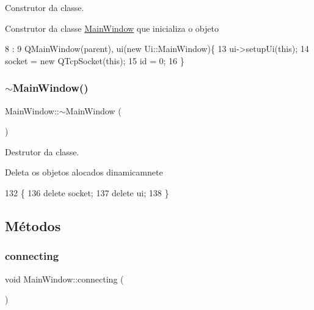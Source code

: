 Construtor da classe. 

Construtor da classe \hyperlink{class_main_window}{Main\+Window} que inicializa o objeto
\begin{DoxyCode}
8                                       :
9   QMainWindow(parent), ui(\textcolor{keyword}{new} Ui::MainWindow)\{
13   ui->setupUi(\textcolor{keyword}{this});
14   socket = \textcolor{keyword}{new} QTcpSocket(\textcolor{keyword}{this});
15   \textcolor{keywordtype}{id} = 0;
16 \}
\end{DoxyCode}
\mbox{\label{class_main_window_ae98d00a93bc118200eeef9f9bba1dba7}} 
\subsubsection{\texorpdfstring{$\sim$\+Main\+Window()}{~MainWindow()}}
{\footnotesize\ttfamily Main\+Window\+::$\sim$\+Main\+Window (\begin{DoxyParamCaption}{ }\end{DoxyParamCaption})}



Destrutor da classe. 

Deleta os objetos alocados dinamicamnete
\begin{DoxyCode}
132                        \{
136   \textcolor{keyword}{delete} socket;
137   \textcolor{keyword}{delete} ui;
138 \}
\end{DoxyCode}


\subsection{Métodos}
\mbox{\label{class_main_window_afd17285381f6457c552f26f359f8f968}} 
\subsubsection{\texorpdfstring{connecting}{connecting}}
{\footnotesize\ttfamily void Main\+Window\+::connecting (\begin{DoxyParamCaption}{ }\end{DoxyParamCaption})\hspace{0.3cm}{\ttfamily [slot]}}



